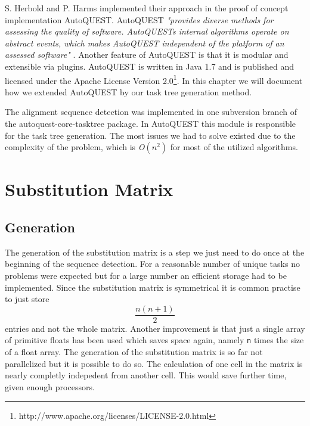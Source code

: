 
S. Herbold and P. Harms implemented their approach in the proof of concept implementation AutoQUEST.
AutoQUEST \textit{"provides diverse methods for assessing the quality
of software. AutoQUESTs internal algorithms operate on
abstract events, which makes AutoQUEST independent of
the platform of an assessed software"} \cite{herbold2013}. 
Another feature of AutoQUEST is that it is modular and extensible via plugins.
AutoQUEST is written in Java 1.7 and is published and licensed under the Apache License Version 2.0\footnote{http://www.apache.org/licenses/LICENSE-2.0.html}.
In this chapter we will document how we extended AutoQUEST by our task tree generation method.

The alignment sequence detection was implemented in one subversion branch of the autoquest-core-tasktree package. 
In AutoQUEST this module is responsible for the task tree generation. 
The most issues we had to solve existed due to the complexity of the problem, which is \textit{O}$(n^2)$ for most of the utilized algorithms.

\section{Substitution Matrix}
\subsection{Generation}
The generation of the substitution matrix is a step we just need to do once at the beginning of the sequence detection.
For a reasonable number of unique tasks no problems were expected but for a large number an efficient storage had to be implemented.
Since the substitution matrix is symmetrical it is common practise to just store \begin{equation*} \frac{n(n+1)}{2}\end{equation*} entries and not the whole matrix. 
Another improvement is that just a single array of primitive floats has been used which saves space again, namely \texttt{n} times the size of a float array.
The generation of the substitution matrix is so far not parallelized but it is possible to do so. 
The calculation of one cell in the matrix is nearly completly indepedent from another cell. 
This would save further time, given enough processors.



